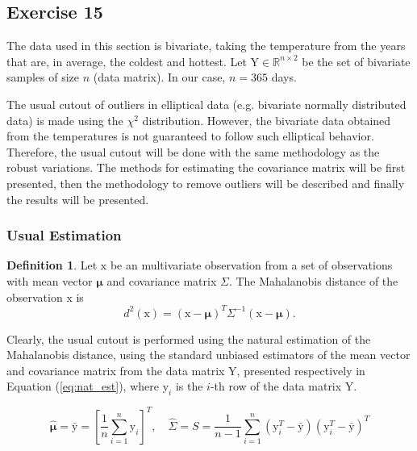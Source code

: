\documentclass[11pt]{article}
\theoremstyle{definition}
\newtheorem{definition}{Definition}[section]
\theoremstyle{remark}
\theoremstyle{remark}
\begin{document}
\subsection*{Exercise 15}
The data used in this section is bivariate, taking the temperature
from the years that are, in average, the coldest and hottest. Let
$\boldsymbol{\mathrm{Y}}\in\mathbb{R}^{n\times2}$ be the set of
bivariate samples of size $n$ (data matrix). In our case, $n=365$
days.


The usual cutout of outliers in elliptical data (e.g. bivariate
normally distributed data) is made using the $\chi^2$
distribution. However, the bivariate data obtained from the
temperatures is not guaranteed to follow such elliptical
behavior. Therefore, the usual cutout will be done with the same
methodology as the robust variations. The methods for estimating the
covariance matrix will be first presented, then the methodology to
remove outliers will be described and finally the results will be
presented.

\subsubsection*{Usual Estimation}
\begin{definition}
  Let $\boldsymbol{\mathrm{x}}$ be an multivariate observation from a
  set of observations with mean vector $\boldsymbol{\mu}$ and
  covariance matrix $\Sigma$. The Mahalanobis distance of the
  observation $\boldsymbol{\mathrm{x}}$ is
\begin{equation}\label{eq:mahal}
  d^2(\boldsymbol{\mathrm{x}}) = (\boldsymbol{\mathrm{x}} - \boldsymbol{\mu})^T\Sigma^{-1}(\boldsymbol{\mathrm{x}} - \boldsymbol{\mu}).
\end{equation}

\end{definition}

Clearly, the usual cutout is performed using the natural estimation of
the Mahalanobis distance, using the standard unbiased estimators of
the mean vector and covariance matrix from the data matrix
$\boldsymbol{\mathrm{Y}}$, presented respectively in Equation
(\ref{eq:nat_est}), where $\boldsymbol{\mathrm{y}}_i$ is the $i$-th
row of the data matrix $\boldsymbol{\mathrm{Y}}$.

\begin{equation}\label{eq:nat_est}
  \hat{\boldsymbol\mu}=\bar{\boldsymbol{\mathrm{y}}}=\left[\dfrac{1}{n}\sum_{i=1}^{n}\boldsymbol{\mathrm{y}}_i\right]^T,\quad \hat{\Sigma}=S=\dfrac{1}{n-1}\sum_{i=1}^{n} (\boldsymbol{\mathrm{y}}_i^T-\bar{\boldsymbol{\mathrm{y}}})(\boldsymbol{\mathrm{y}}_i^T-\bar{\boldsymbol{\mathrm{y}}})^T
\end{equation}
\end{document}
